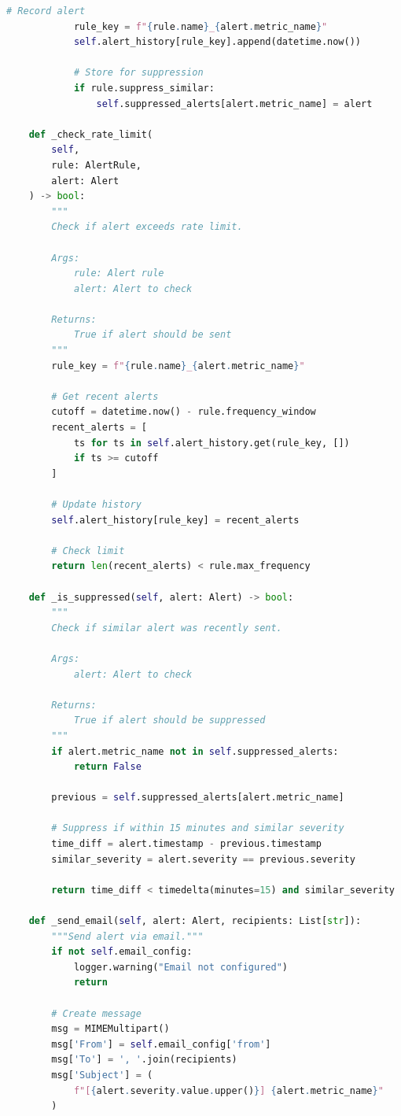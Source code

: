 \begin{lstlisting}[language=Python, caption={Alert Management System}]
            # Record alert
            rule_key = f"{rule.name}_{alert.metric_name}"
            self.alert_history[rule_key].append(datetime.now())

            # Store for suppression
            if rule.suppress_similar:
                self.suppressed_alerts[alert.metric_name] = alert

    def _check_rate_limit(
        self,
        rule: AlertRule,
        alert: Alert
    ) -> bool:
        """
        Check if alert exceeds rate limit.

        Args:
            rule: Alert rule
            alert: Alert to check

        Returns:
            True if alert should be sent
        """
        rule_key = f"{rule.name}_{alert.metric_name}"

        # Get recent alerts
        cutoff = datetime.now() - rule.frequency_window
        recent_alerts = [
            ts for ts in self.alert_history.get(rule_key, [])
            if ts >= cutoff
        ]

        # Update history
        self.alert_history[rule_key] = recent_alerts

        # Check limit
        return len(recent_alerts) < rule.max_frequency

    def _is_suppressed(self, alert: Alert) -> bool:
        """
        Check if similar alert was recently sent.

        Args:
            alert: Alert to check

        Returns:
            True if alert should be suppressed
        """
        if alert.metric_name not in self.suppressed_alerts:
            return False

        previous = self.suppressed_alerts[alert.metric_name]

        # Suppress if within 15 minutes and similar severity
        time_diff = alert.timestamp - previous.timestamp
        similar_severity = alert.severity == previous.severity

        return time_diff < timedelta(minutes=15) and similar_severity

    def _send_email(self, alert: Alert, recipients: List[str]):
        """Send alert via email."""
        if not self.email_config:
            logger.warning("Email not configured")
            return

        # Create message
        msg = MIMEMultipart()
        msg['From'] = self.email_config['from']
        msg['To'] = ', '.join(recipients)
        msg['Subject'] = (
            f"[{alert.severity.value.upper()}] {alert.metric_name}"
        )


\end{lstlisting}
